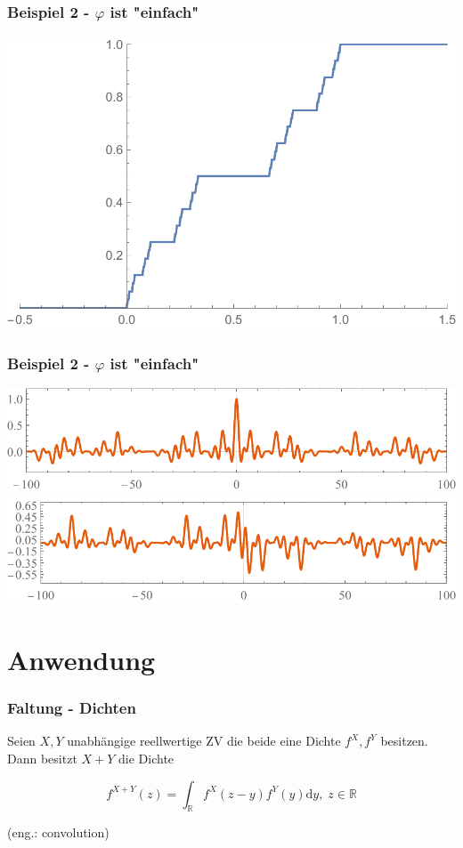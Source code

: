 \documentclass{beamer}
\newcommand{\R}{\mathbb{R}}
\newcommand\dint{\mathord{\mathrm{d}}}
\begin{document}
\begin{frame}
\frametitle{Beispiel 2 - $\varphi$ ist "einfach"}
\includegraphics[width=\linewidth, height=\textheight,keepaspectratio]{presentation/plots/cantor.pdf}
\end{frame}

\begin{frame}
\frametitle{Beispiel 2 - $\varphi$ ist "einfach"}
\includegraphics[width=\linewidth, height=.4\textheight,keepaspectratio]{presentation/plots/cantor_re.pdf}
\includegraphics[width=\linewidth, height=.4\textheight,keepaspectratio]{presentation/plots/cantor_im.pdf}
\end{frame}

\section{Anwendung}

\begin{frame}
\frametitle{Faltung - Dichten}
  Seien $X, Y$ unabhängige reellwertige ZV die beide eine Dichte $f^X, f^Y$ besitzen. Dann besitzt $X+Y$ die Dichte

\begin{equation*}
  f^{X+Y}(z) = \int_{\R} f^X(z - y)f^Y(y) \dint y, \; z \in \R
\end{equation*}

(eng.: convolution)
\end{frame}
\end{document}
